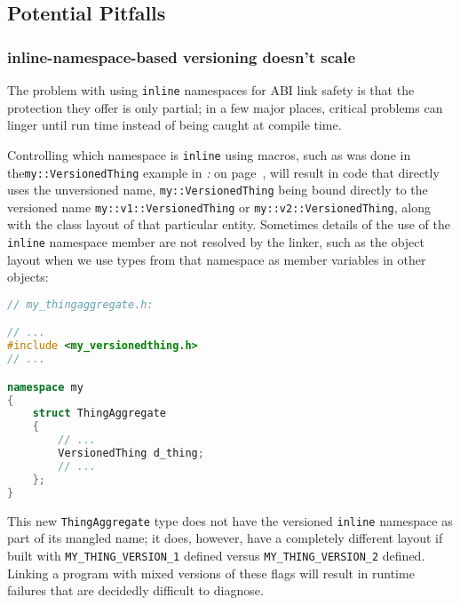 \subsection[Potential Pitfalls]{Potential Pitfalls}\label{potential-pitfalls-inlinenamespace}

\subsubsection[{\tt inline}-namespace-based versioning doesn’t scale]{{\SubsubsecCode inline}-namespace-based versioning doesn’t scale}\label{inline-namespace-based-versioning-doesn’t-scale}

The problem with using \texttt{inline} namespaces for ABI link safety is
that the protection they offer is only partial; in a few major places,
critical problems can linger until run time instead of being caught at
compile time.

Controlling which namespace is \texttt{inline} using macros, such as was
done in the\linebreak[4] \texttt{my::VersionedThing} example in \textit{: } on page~\pageref{link-safe-abi-versioning}, will result in code that
directly uses the unversioned name, \texttt{my::VersionedThing} being
bound directly to the versioned name \texttt{my::v1::VersionedThing} or
\texttt{my::v2::VersionedThing}, along with the class layout of that
particular entity. Sometimes details of the use of the \texttt{inline}
namespace member are not resolved by the linker, such as the object
layout when we use types from that namespace as member variables in
other objects:

\begin{lstlisting}[language=C++]
// my_thingaggregate.h:

// ...
#include <my_versionedthing.h>
// ...

namespace my
{
    struct ThingAggregate
    {
        // ...
        VersionedThing d_thing;
        // ...
    };
}
\end{lstlisting}

\noindent This new \texttt{ThingAggregate} type does not have the versioned
\texttt{inline} namespace as part of its mangled name; it does, however,
have a completely different layout if built with
\texttt{MY\_THING\_VERSION\_1} defined
versus \texttt{MY\_THING\_VERSION\_2} defined. Linking a program with mixed
versions of these flags will result in runtime failures that are
decidedly difficult to diagnose.

